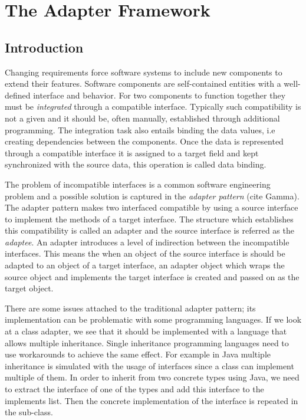 \chapter{The Adapter Framework}

\section{Introduction}

Changing requirements force software systems to include new components to extend their features. 
Software components are self-contained entities with a well-defined interface and behavior. 
For two components to function together they must be \emph{integrated} through a compatible interface. 
Typically such compatibility is not a given and it should be, often manually, established through additional programming. 
The integration task also entails binding the data values, i.e creating dependencies between the components. 
Once the data is represented through a compatible interface it is assigned to a target field and kept synchronized with the source data, this operation is called data binding.

The problem of incompatible interfaces is a common software engineering problem and a possible  solution is captured in the \emph{adapter pattern} (cite Gamma).
The adapter pattern makes two interfaced compatible by using a source interface to implement the methods of a target interface. 
The structure which establishes this compatibility is called an adapter and the source interface is referred as the \emph{adaptee}. 
An adapter introduces  a level of indirection between the incompatible interfaces.
This means the when an object of the source interface is should be adapted to an object of a target interface, an adapter object which wraps the source object and implements the target interface is created and passed on as the target object. 

There are some issues attached to the traditional adapter pattern; its implementation can be problematic with some programming languages.
If we look at a class adapter, we see that it should be implemented with a language that allows multiple inheritance. 
Single inheritance programming languages need to use workarounds to achieve the same effect.
For example in Java multiple inheritance is simulated with the usage of interfaces since a class can implement multiple of them. 
In order to inherit from two concrete types using Java, we need to extract the interface of one of the types and add this interface to the implements list. 
Then the concrete implementation of the interface is repeated in the sub-class. 

